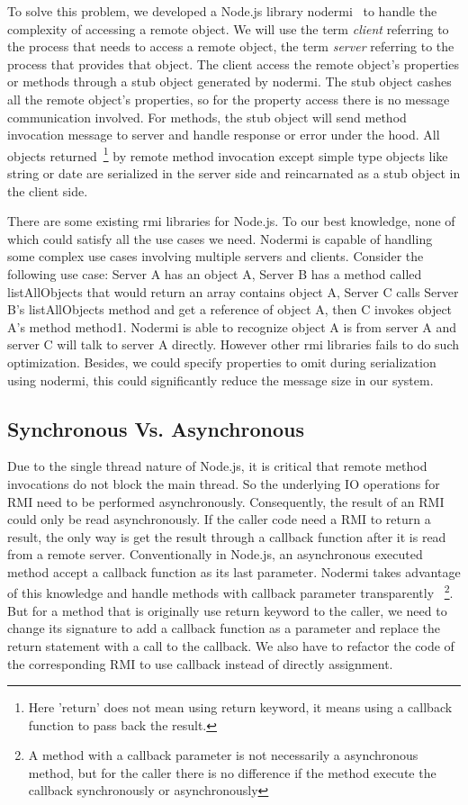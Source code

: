 To solve this problem,
we developed a Node.js library nodermi~\cite{nodermi} to handle the complexity of accessing a remote object.
We will use the term \emph{client} referring to the process that needs to access a remote object,
the term \emph{server} referring to the process that provides that object.
The client access the remote object's properties or methods through a stub object generated by nodermi.
The stub object cashes all the remote object's properties,
so for the property access there is no message communication involved.
For methods,
the stub object will send method invocation message to server and handle response or error under the hood.
All objects returned~\footnote{Here 'return' does not mean using return keyword, it means using a callback function to pass back the result.} by remote method invocation
 except simple type objects like string or date are serialized in the server side
 and reincarnated as a stub object in the client side.

There are some existing rmi libraries for Node.js.
To our best knowledge, none of which could satisfy all the use cases we need.
Nodermi is capable of handling some complex use cases involving multiple servers and clients.
Consider the following use case:
Server A has an object A,
Server B has a method called listAllObjects that would return an array contains object A,
Server C calls Server B's listAllObjects method and get a reference of object A,
then C invokes object A's method method1.
Nodermi is able to recognize object A is from server A and server C will talk to server A directly.
However other rmi libraries fails to do such optimization.
Besides, we could specify properties to omit during serialization using nodermi,
this could significantly reduce the message size in our system.

\subsection{Synchronous Vs. Asynchronous}
Due to the single thread nature of Node.js,
it is critical that remote method invocations do not block the main thread.
So the underlying IO operations for RMI need to be performed asynchronously.
Consequently, the result of an RMI could only be read asynchronously.
If the caller code need a RMI to return a result,
the only way is get the result through a callback function
after it is read from a remote server.
Conventionally in Node.js, an asynchronous executed method
accept a callback function as its last parameter.
Nodermi takes advantage of this knowledge and handle methods with callback parameter transparently
~\footnote{A method with a callback parameter is not necessarily a asynchronous method,
but for the caller there is no difference if the method execute the callback synchronously or asynchronously}.
But for a method that is originally use return keyword to the caller,
we need to change its signature to add a callback function as a parameter and
replace the return statement with a call to the callback. %
We also have to refactor the code of the corresponding RMI to use callback instead of
directly assignment.




